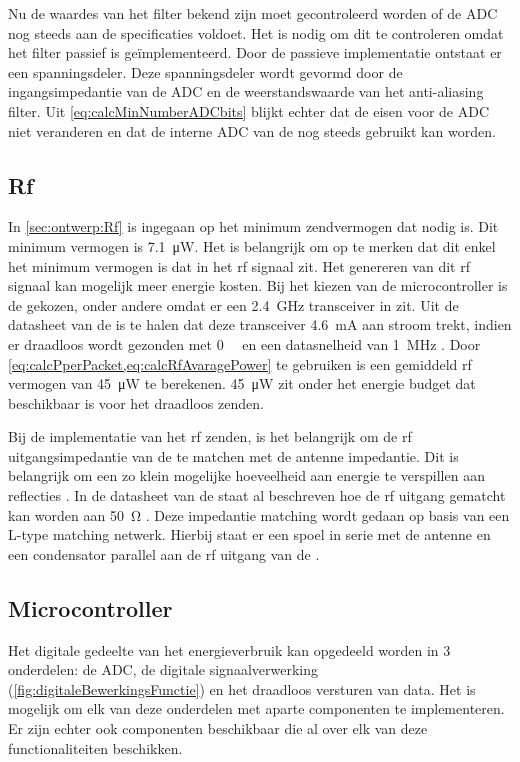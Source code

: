 Nu de waardes van het filter bekend zijn moet gecontroleerd worden of de ADC nog steeds aan de specificaties voldoet. Het is nodig om dit te controleren omdat het filter passief is geïmplementeerd. Door de passieve implementatie ontstaat er een spanningsdeler. Deze spanningsdeler wordt gevormd door de ingangsimpedantie van de ADC en de weerstandswaarde van het anti-aliasing filter. Uit \cref{eq:calcMinNumberADCbits} blijkt echter dat de eisen voor de ADC niet veranderen en dat de interne ADC van de \mcu nog steeds gebruikt kan worden.

\subsection{Rf}
In \cref{sec:ontwerp:Rf} is ingegaan op het minimum zendvermogen dat nodig is. Dit minimum vermogen is \qty{7.1}{\micro\watt}. Het is belangrijk om op te merken dat dit enkel het minimum vermogen is dat in het rf signaal zit. Het genereren van dit rf signaal kan mogelijk meer energie kosten. Bij het kiezen van de microcontroller is de \mcu gekozen, onder andere omdat er een \qty{2.4}{\giga\hertz} transceiver in zit. Uit de datasheet van de \mcu is te halen dat deze transceiver \qty{4.6}{\milli\ampere} aan stroom trekt, indien er draadloos wordt gezonden met \qty{0}{\deci\belmilliwatt} en een datasnelheid van \qty{1}{\mega\hertz} \cite{nrf52810}. Door \cref{eq:calcPperPacket,eq:calcRfAvaragePower} te gebruiken is een gemiddeld rf vermogen van \qty{45}{\micro\watt} te berekenen. \qty{45}{\micro\watt} zit onder het energie budget dat beschikbaar is voor het draadloos zenden.

Bij de implementatie van het rf zenden, is het belangrijk om de rf uitgangsimpedantie van de \mcu te matchen met de antenne impedantie. Dit is belangrijk om een zo klein mogelijke hoeveelheid aan energie te verspillen aan reflecties \cite{FundamentalsofAppliedElectromagnetics}. In de datasheet van de \mcu staat al beschreven hoe de rf uitgang gematcht kan worden aan \qty{50}{\ohm} \cite{nrf52810}. Deze impedantie matching wordt gedaan op basis van een L-type matching netwerk. Hierbij staat er een spoel in serie met de antenne en een condensator parallel aan de rf uitgang van de \mcu \cite{nrf52810}.

\subsection{Microcontroller}
Het digitale gedeelte van het energieverbruik kan opgedeeld worden in 3 onderdelen: de ADC, de digitale signaalverwerking (\cref{fig:digitaleBewerkingsFunctie}) en het draadloos versturen van data. Het is mogelijk om elk van deze onderdelen met aparte componenten te implementeren. Er zijn echter ook componenten beschikbaar die al over elk van deze functionaliteiten beschikken.

